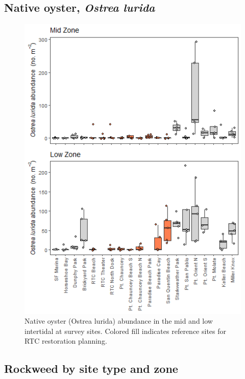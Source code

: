 \documentclass[
]{article}
\begin{document}
\hypertarget{native-oyster-ostrea-lurida}{%
\subsection{\texorpdfstring{Native oyster, \emph{Ostrea lurida}}{Native oyster, Ostrea lurida}}\label{native-oyster-ostrea-lurida}}

\begin{figure}

\includegraphics{sfb_quadrats_files/figure-latex/oysters-by-zone-site-fig-1} \hfill{}

\caption{ Native oyster (Ostrea lurida) abundance in the mid and low intertidal at survey sites. Colored fill indicates reference sites for RTC restoration planning.}\label{fig:oysters-by-zone-site-fig}
\end{figure}

\hypertarget{rockweed-by-site-type-and-zone}{%
\subsection{Rockweed by site type and zone}\label{rockweed-by-site-type-and-zone}}
\end{document}
